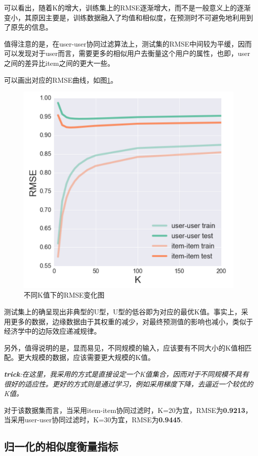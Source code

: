 \documentclass[utf8, a4paper, 11pt, onecolumn]{ctexart}
\begin{document}
\begin{spacing}{1.3}
可以看出，随着K的增大，训练集上的RMSE逐渐增大，而不是一般意义上的逐渐变小，其原因主要是，训练数据融入了均值和相似度，在预测时不可避免地利用到了原先的信息。

值得注意的是，在user-user协同过滤算法上，测试集的RMSE中间较为平缓，因而可以发现对于user而言，需要更多的相似用户去衡量这个用户的属性，也即，user之间的差异比item之间的更大一些。

可以画出对应的RMSE曲线，如图\ref{k-figure}。

\begin{figure}
	\centering
	\includegraphics[width=0.8\linewidth]{k-figure.png}
	\caption{不同K值下的RMSE变化图}
	\label{k-figure}
\end{figure}

测试集上的确呈现出非典型的U型，U型的低谷即为对应的最优K值。事实上，采用更多的数据，边缘数据由于其权重的减少，对最终预测值的影响也减小，类似于经济学中的边际效应递减规律。

另外，值得说明的是，显而易见，不同规模的输入，应该要有不同大小的K值相匹配。更大规模的数据，应该需要更大规模的K值。

\textit{\textbf{trick}:在这里，我采用的方式是直接设定一个K值集合，因而对于不同规模不具有很好的适应性。更好的方式则是通过学习，例如采用梯度下降，去逼近一个较优的K值。}

对于该数据集而言，当采用item-item协同过滤时，K=20为宜，RMSE为\textbf{0.9213}，当采用user-user协同过滤时，K=30为宜，RMSE为\textbf{0.9445}.

\subsection{归一化的相似度衡量指标}


\end{spacing}
\end{document}
